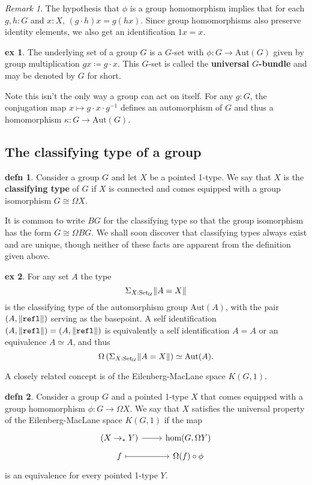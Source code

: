 \documentclass{amsart}
\theoremstyle{theorem}
\theoremstyle{definition}
\newtheorem*{defn}{defn}
\newtheorem*{ex}{ex}
\theoremstyle{remark}
\newtheorem*{rmk}{Remark}
\newcommand{\Aut}{\mathrm{Aut}}
\newcommand{\0}{\mathbbe{0}}
\newcommand{\1}{\mathbbe{1}}
\newcommand{\2}{\mathbbe{2}}
\newcommand{\3}{\mathbbe{3}}
\newcommand{\4}{\mathbbe{4}}
\newcommand{\term}[1]{{\textup{\texttt{#1}}}}
\newcommand{\type}[1]{{\textup{#1}}}
\newcommand{\refl}{\term{refl}}
\newcommand{\UU}{{\mathcal{U}}}
\newcommand{\Set}{\type{Set}_{\UU}}
\newcommand{\mere}[1]{\|{#1}\|}
\begin{document}
\begin{rmk} The hypothesis that $\phi$ is a group homomorphism implies that for each $g, h : G$ and $x : X$, $(g\cdot h)x = g (h x)$. Since group homomorphisms also preserve identity elements, we also get an identification $1 x = x$.
\end{rmk}

\begin{ex} The underlying set of a group $G$ is a $G$-set with $\phi : G \to \Aut(G)$ given by group multiplication $g x \coloneq g \cdot x$. This $G$-set is called the \textbf{universal $G$-bundle} and may be denoted by $G$ for short.
\end{ex}

Note this isn't the only way a group can act on itself. For any $g : G$, the conjugation map $x \mapsto g \cdot x \cdot g^{-1}$ defines an automorphism of $G$ and thus a homomorphism $\kappa \colon G \to \Aut(G)$.

\subsection*{The classifying type of a group}

\begin{defn} Consider a group $G$ and let $X$ be a pointed 1-type. We say that $X$ is the \textbf{classifying type} of $G$ if $X$ is connected and comes equipped with a group isomorphism $G \cong \Omega X$.
\end{defn}

It is common to write $BG$ for the classifying type so that the group isomorphism has the form $G \cong \Omega BG$. We shall soon discover that classifying types always exist and are unique, though neither of these facts are apparent from the definition given above.

\begin{ex} For any set $A$ the type
\[ \Sigma_{X : \Set} \mere{A = X}\]
is the classifying type of the automorphism group $\Aut(A)$, with the pair $(A, \|\refl\|)$ serving as the basepoint. A self identification $(A, \|\refl\|) = (A, \|\refl\|)$ is equivalently a self identification $A=A$ or an equivalence $A \simeq A$, and thus 
\[ \Omega \left(\Sigma_{X : \Set} \mere{A = X} \right) \simeq \Aut(A).\]
\end{ex}

A closely related concept is of the Eilenberg-MacLane space $K(G,1)$.

\begin{defn} Consider a group $G$ and a pointed 1-type $X$ that comes equipped with a group homomorphism $\phi \colon G \to \Omega X$. We say that $X$ satisfies the universal property of the Eilenberg-MacLane space $K(G,1)$ if the map
\[
\begin{tikzcd}[row sep=tiny] (X \to_* Y) \arrow[r] & \type{hom}(G,\Omega Y) \\
f \arrow[r, maps to] & \Omega (f) \circ \phi
\end{tikzcd}
\]
is an equivalence for every pointed 1-type $Y$.
\end{defn}
\end{document}
